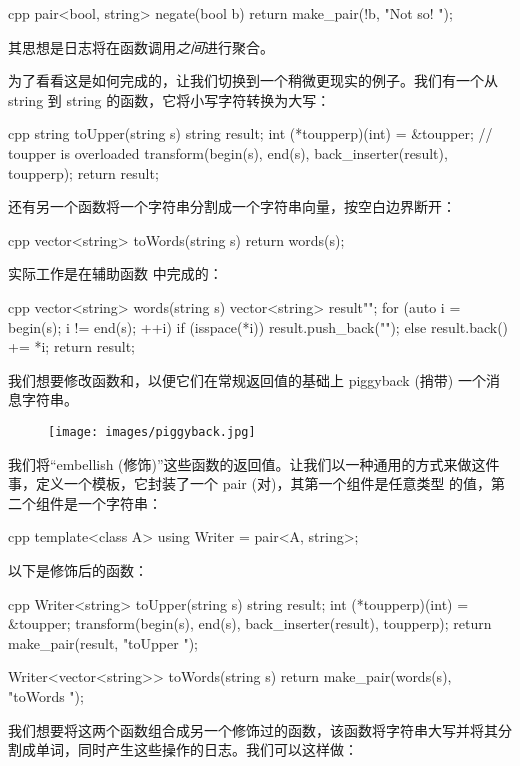\begin{snip}{cpp}
pair<bool, string> negate(bool b) {
    return make_pair(!b, "Not so! ");
}
\end{snip}
其思想是日志将在函数调用\emph{之间}进行聚合。

为了看看这是如何完成的，让我们切换到一个稍微更现实的例子。我们有一个从 string 到 string 的函数，它将小写字符转换为大写：

\begin{snip}{cpp}
string toUpper(string s) {
    string result;
    int (*toupperp)(int) = &toupper; // toupper is overloaded
    transform(begin(s), end(s), back_inserter(result), toupperp);
    return result;
}
\end{snip}
还有另一个函数将一个字符串分割成一个字符串向量，按空白边界断开：

\begin{snip}{cpp}
vector<string> toWords(string s) {
    return words(s);
}
\end{snip}
实际工作是在辅助函数 中完成的：

\begin{snip}{cpp}
vector<string> words(string s) {
    vector<string> result{""};
    for (auto i = begin(s); i != end(s); ++i)
    {
        if (isspace(*i))
            result.push_back("");
        else
            result.back() += *i;
    }
    return result;
}
\end{snip}
我们想要修改函数和，以便它们在常规返回值的基础上 piggyback (捎带) 一个消息字符串。

\begin{figure}[H]
  \centering
  \texttt{[image: images/piggyback.jpg]}
\end{figure}
\noindent
我们将“embellish (修饰)”这些函数的返回值。让我们以一种通用的方式来做这件事，定义一个模板，它封装了一个 pair (对)，其第一个组件是任意类型 的值，第二个组件是一个字符串：

\begin{snip}{cpp}
template<class A>
using Writer = pair<A, string>;
\end{snip}
以下是修饰后的函数：

\begin{snip}{cpp}
Writer<string> toUpper(string s) {
    string result;
    int (*toupperp)(int) = &toupper;
    transform(begin(s), end(s), back_inserter(result), toupperp);
    return make_pair(result, "toUpper ");
}

Writer<vector<string>> toWords(string s) {
    return make_pair(words(s), "toWords ");
}
\end{snip}
我们想要将这两个函数组合成另一个修饰过的函数，该函数将字符串大写并将其分割成单词，同时产生这些操作的日志。我们可以这样做：

